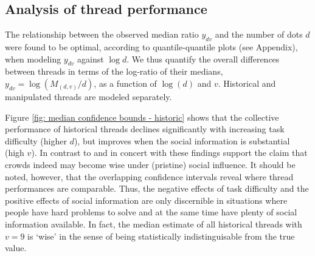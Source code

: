 \documentclass[9pt,twocolumn,twoside,lineno]{pnas-new}
\begin{document}


\subsection*{Analysis of thread performance}
The relationship between the observed median ratio $y_{dv}$ and the number of dots $d$ were found to be optimal, according to quantile-quantile plots (see Appendix), when modeling $y_{dv}$ against $\log{d}$. We thus quantify the overall differences between threads in terms of the log-ratio of their medians, $y_{dv}=\log(M_{(d,v)}/d)$, as a function of $\log(d)$ and $v$. Historical and manipulated threads are modeled separately.

Figure \ref{fig: median confidence bounds - historic} shows that the collective performance of historical threads declines significantly with increasing task difficulty (higher $d$), but improves when the social information is substantial (high $v$). In contrast to \cite{lorenz2011social, king2011true, minson2012cost} and in concert with \cite{gurccay2015power, becker2017network, jayles2017social, farrell2011social} these findings support the claim that crowds indeed may become wise under (pristine) social influence. It should be noted, however, that the overlapping confidence intervals reveal where thread performances are comparable. Thus, the negative effects of task difficulty and the positive effects of social information are only discernible in situations where people have hard problems to solve and at the same time have plenty of social information available. In fact, the median estimate of all historical threads with $v=9$ is `wise' in the sense of being statistically indistinguisable from the true value.
\end{document}
